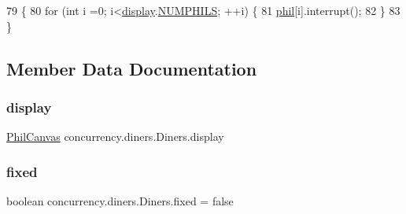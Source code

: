 \begin{DoxyCode}
79                        \{
80         \textcolor{keywordflow}{for} (\textcolor{keywordtype}{int} i =0; i<\mbox{\hyperlink{classconcurrency_1_1diners_1_1_diners_a89ca881884065b1e357a0556bb1be1fe}{display}}.\mbox{\hyperlink{classconcurrency_1_1diners_1_1_phil_canvas_a3eeb58e8b150bc1715a708ef38171fd5}{NUMPHILS}}; ++i) \{
81             \mbox{\hyperlink{classconcurrency_1_1diners_1_1_diners_adf06d18b05e5ad766ef522c1744bee13}{phil}}[i].interrupt();
82         \}
83     \}
\end{DoxyCode}


\subsection{Member Data Documentation}
\mbox{\label{classconcurrency_1_1diners_1_1_diners_a89ca881884065b1e357a0556bb1be1fe}} 
\subsubsection{\texorpdfstring{display}{display}}
{\footnotesize\ttfamily \mbox{\hyperlink{classconcurrency_1_1diners_1_1_phil_canvas}{Phil\+Canvas}} concurrency.\+diners.\+Diners.\+display\hspace{0.3cm}{\ttfamily [package]}}

\mbox{\label{classconcurrency_1_1diners_1_1_diners_a4c5e0aefcf719aeed27ca1bb9dca8294}} 
\subsubsection{\texorpdfstring{fixed}{fixed}}
{\footnotesize\ttfamily boolean concurrency.\+diners.\+Diners.\+fixed = false\hspace{0.3cm}{\ttfamily [package]}}

\mbox{\label{classconcurrency_1_1diners_1_1_diners_ab9e7ad456ad4ea3b62cea71de11c147d}} 
